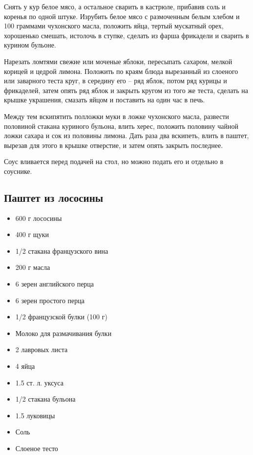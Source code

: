 Снять у кур белое мясо, а остальное сварить в кастрюле, прибавив соль и коренья по одной штуке. Изрубить белое мясо с размоченным белым хлебом и 100 граммами чухонского масла, положить яйца, тертый мускатный орех, хорошенько смешать, истолочь в ступке, сделать из фарша фрикадели и сварить в курином бульоне.

Нарезать ломтями свежие или моченые яблоки, пересыпать сахаром, мелкой корицей и цедрой лимона. Положить по краям блюда вырезанный из слоеного или заварного теста круг, в середину его – ряд яблок, потом ряд курицы и фрикаделей, затем опять ряд яблок и закрыть кругом из того же теста, сделать на крышке украшения, смазать яйцом и поставить на один час в печь.

Между тем вскипятить полложки муки в ложке чухонского масла, развести половиной стакана куриного бульона, влить херес, положить половину чайной ложки сахара и сок из половины лимона. Дать раза два вскипеть, влить в паштет, вырезав для этого в крышке отверстие, и затем опять закрыть последнее.

Соус вливается перед подачей на стол, но можно подать его и отдельно в соуснике.

\subsection{Паштет из лососины}

\begin{itemize}
	\item 600 г лососины 
    \item 400 г щуки 
    \item 1/2 стакана французского вина
    \item 200 г масла
    \item 6 зерен английского перца
    \item 6 зерен простого перца
    \item 1/2 французской булки (100 г)
    \item Молоко для размачивания булки
    \item 2 лавровых листа
    \item 4 яйца 
    \item 1.5 ст. л. уксуса
    \item 1/2 стакана бульона
    \item 1.5 луковицы 
    \item Соль 
    \item Слоеное тесто
\end{itemize}

